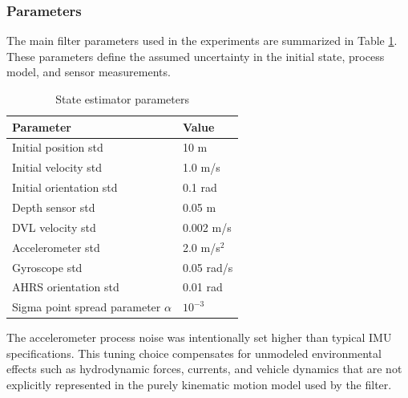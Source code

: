 \subsubsection{Parameters}
The main filter parameters used in the experiments are summarized in Table \ref{tab:ukf-params}. These parameters define the assumed uncertainty in the initial state, process model, and sensor measurements.
\begin{table}[H]
    \centering
    \caption{State estimator parameters}
    \label{tab:ukf-params}
    \begin{tabular}{l l}
        \hline
        Parameter & Value \\
        \hline
        Initial position std & 10 m \\
        Initial velocity std & 1.0 m/s \\
        Initial orientation std & 0.1 rad \\
        Depth sensor std & 0.05 m \\
        DVL velocity std & 0.002 m/s \\
        Accelerometer std & 2.0 m/s$^2$ \\
        Gyroscope std & 0.05 rad/s \\
        AHRS orientation std & 0.01 rad \\
        Sigma point spread parameter $\alpha$ & $10^{-3}$ \\
        \hline
    \end{tabular}
\end{table}
\noindent
The accelerometer process noise was intentionally set higher than typical IMU specifications. This tuning choice compensates for unmodeled environmental effects such as hydrodynamic forces, currents, and vehicle dynamics that are not explicitly represented in the purely kinematic motion model used by the filter.



\newpage



